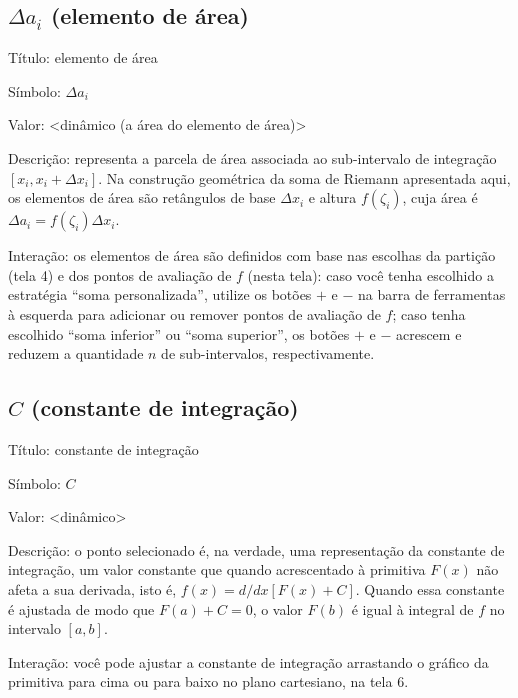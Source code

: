 \documentclass[a4paper,10pt]{scrartcl}
\newcommand\subintervalo{\ensuremath{[x_i, x_i + \Delta x_i]}}
\begin{document}
    \newpage
    
  \subsection*{$\Delta a_i$ (elemento de área)}
    \begin{compactdesc}
	\item{Título:} elemento de área
	\item{Símbolo:} $\Delta a_i$
	\item{Valor:} <dinâmico (a área do elemento de área)>
	\item{Descrição:} representa a parcela de área associada ao sub-intervalo de integração \subintervalo. Na construção geométrica da soma de Riemann apresentada aqui, os elementos de área são retângulos de base $\Delta x_i$ e altura $f(\zeta_i)$, cuja área é $\Delta a_i = f(\zeta_i) \Delta x_i$.
	\item{Interação:} os elementos de área são definidos com base nas escolhas da partição (tela 4) e dos pontos de avaliação de $f$ (nesta tela): caso você tenha escolhido a estratégia ``soma personalizada'', utilize os botões $+$ e $-$ na barra de ferramentas à esquerda para adicionar ou remover pontos de avaliação de $f$; caso tenha escolhido ``soma inferior'' ou ``soma superior'', os botões $+$ e $-$ acrescem e reduzem a quantidade $n$ de sub-intervalos, respectivamente.
    \end{compactdesc}
	
  \subsection*{$C$ (constante de integração)}
    \begin{compactdesc}
	\item{Título:} constante de integração
	\item{Símbolo:} $C$
	\item{Valor:} <dinâmico>
	\item{Descrição:} o ponto selecionado é, na verdade, uma representação da constante de integração, um valor constante que quando acrescentado à primitiva $F(x)$ não afeta a sua derivada, isto é, $f(x) = d/dx [F(x)+C]$. Quando essa constante é ajustada de modo que $F(a) + C = 0$, o valor $F(b)$ é igual à integral de $f$ no intervalo $[a,b]$.
	\item{Interação:} você pode ajustar a constante de integração arrastando o gráfico da primitiva para cima ou para baixo no plano cartesiano, na tela 6.
    \end{compactdesc}
    
\end{document}
